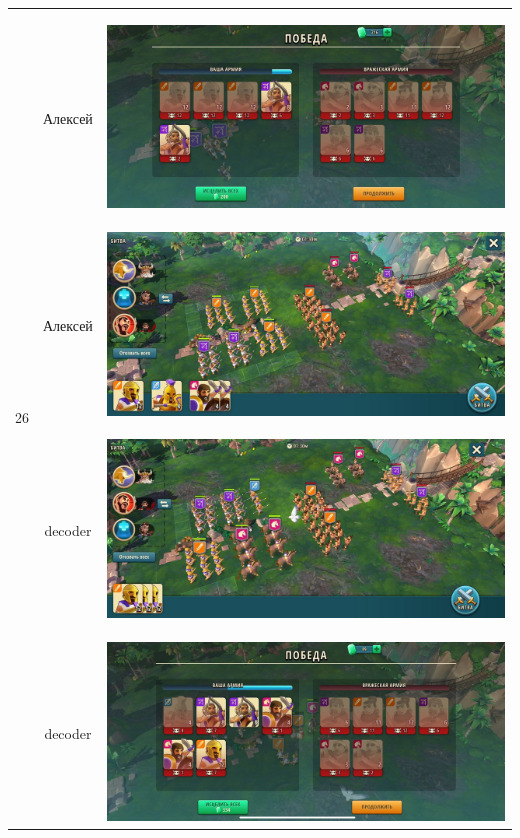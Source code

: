 \begin{longtable}{|c|c|c|}
	\hline
	\multirow{4}{*}{26} & Алексей &
	\hypertarget{fight26}{\includegraphics[width=0.75\linewidth]{./parts/media/TreasureHunt/26/alexey/photo_2022-04-07_10-09-39.jpg}} \\
	& Алексей &
	\includegraphics[width=0.75\linewidth]{./parts/media/TreasureHunt/26/alexey/photo_2022-04-07_10-09-28.jpg} \\
	\hline
	\multirow{4}{*}{26} & decoder &
	\hypertarget{fight26}{\includegraphics[width=0.75\linewidth]{./parts/media/TreasureHunt/26/decoder/photo_2022-04-06_18-11-14.jpg}} \\
	& decoder &
	\includegraphics[width=0.75\linewidth]{./parts/media/TreasureHunt/26/decoder/photo_2022-04-06_18-11-23.jpg} \\

\end{longtable}
